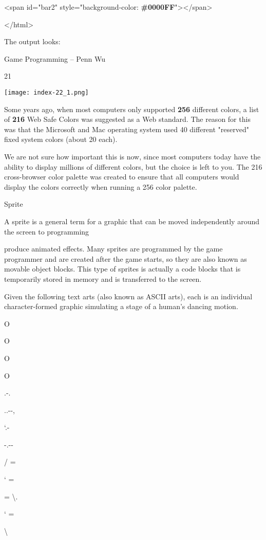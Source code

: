 \documentclass[
]{article}
\begin{document}
\textless span id="bar2" style="background-color:
\textbf{\#0000FF}"\textgreater\textless/span\textgreater{}

\textless/html\textgreater{}

The output looks:

Game Programming -- Penn Wu

21

\protect\hypertarget{index_split_003.htmlux5cux23p22}{}{}\texttt{[image: index-22\_1.png]}

Some years ago, when most computers only supported \textbf{256}
different colors, a list of \textbf{216} Web Safe Colors was suggested
as a Web standard. The reason for this was that the Microsoft and Mac
operating system used 40 different "reserved" fixed system colors (about
20 each).

We are not sure how important this is now, since most computers today
have the ability to display millions of different colors, but the choice
is left to you. The 216 cross-browser color palette was created to
ensure that all computers would display the colors correctly when
running a 256 color palette.

Sprite

A sprite is a general term for a graphic that can be moved independently
around the screen to programming

produce animated effects. Many sprites are programmed by the game
programmer and are created after the game starts, so they are also known
as movable object blocks. This type of sprites is actually a code blocks
that is temporarily stored in memory and is transferred to the screen.

Given the following text arts (also known as ASCII arts), each is an
individual character-formed graphic simulating a stage of a human's
dancing motion.

O

O

O

O

.\textbar-.\textquotesingle{}

..\textbar-\/-,

`.\textbar-

-.\textbar-\/-\textquotesingle{}

/ =

` =

= \textbackslash.

` =

\textbar{} \textbackslash{}
\end{document}
